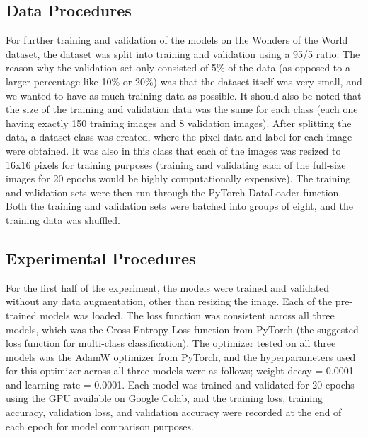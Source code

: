 \documentclass{article}
\begin{document}
\subsection{Data Procedures}

For further training and validation of the models on the Wonders of the World dataset, the dataset was split into training and validation using a 95/5 ratio. The reason why the validation set only consisted of 5\% of the data (as opposed to a larger percentage like 10\% or 20\%) was that the dataset itself was very small, and we wanted to have as much training data as possible. It should also be noted that the size of the training and validation data was the same for each class (each one having exactly 150 training images and 8 validation images). After splitting the data, a dataset class was created, where the pixel data and label for each image were obtained. It was also in this class that each of the images was resized to 16x16 pixels for training purposes (training and validating each of the full-size images for 20 epochs would be highly computationally expensive). The training and validation sets were then run through the PyTorch DataLoader function. Both the training and validation sets were batched into groups of eight, and the training data was shuffled.

\subsection{Experimental Procedures}

For the first half of the experiment, the models were trained and validated without any data augmentation, other than resizing the image. Each of the pre-trained models was loaded. The loss function was consistent across all three models, which was the Cross-Entropy Loss function from PyTorch (the suggested loss function for multi-class classification). The optimizer tested on all three models was the AdamW optimizer from PyTorch, and the hyperparameters used for this optimizer across all three models were as follows; weight decay = 0.0001 and learning rate = 0.0001. Each model was trained and validated for 20 epochs using the GPU available on Google Colab, and the training loss, training accuracy, validation loss, and validation accuracy were recorded at the end of each epoch for model comparison purposes. 
\end{document}
